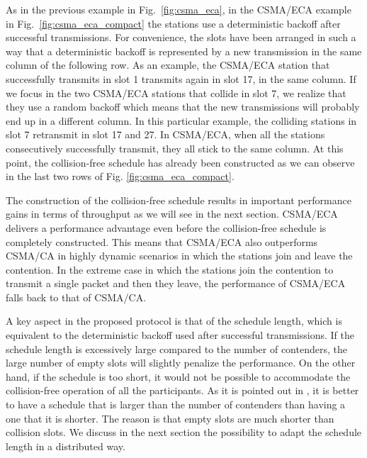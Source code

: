 \documentclass[journal]{IEEEtran}
\begin{document}
As in the previous example in Fig.~\ref{fig:csma_eca}, in the CSMA/ECA example in Fig.~\ref{fig:csma_eca_compact} the stations use a deterministic backoff after successful transmissions.
For convenience, the slots have been arranged in such a way that a deterministic backoff is represented by a new transmission in the same column of the following row.
As an example, the CSMA/ECA station that successfully transmits in slot 1 transmits again in slot 17, in the same column.
If we focus in the two CSMA/ECA stations that collide in slot 7, we realize that they use a random backoff which means that the new transmissions will probably end up in a different column.
In this particular example, the colliding stations in slot 7 retransmit in slot 17 and 27.
In CSMA/ECA, when all the stations consecutively successfully transmit, they all stick to the same column.
At this point, the collision-free schedule has already been constructed as we can observe in the last two rows of Fig. \ref{fig:csma_eca_compact}.

The construction of the collision-free schedule results in important performance gains in terms of throughput as we will see in the next section.
CSMA/ECA delivers a performance advantage even before the collision-free schedule is completely constructed.
This means that CSMA/ECA also outperforms CSMA/CA in highly dynamic scenarios in which the stations join and leave the contention.
In the extreme case in which the stations join the contention to transmit a single packet and then they leave, the performance of CSMA/ECA falls back to that of CSMA/CA.

A key aspect in the proposed protocol is that of the schedule length, which is equivalent to the deterministic backoff used after successful transmissions.
If the schedule length is excessively large compared to the number of contenders, the large number of empty slots will slightly penalize the performance.
On the other hand, if the schedule is too short, it would not be possible to accommodate the collision-free operation of all the participants.
As it is pointed out in \cite{fang2011dlm}, it is better to have a schedule that is larger than the number of contenders than having a one that it is shorter.
The reason is that empty slots are much shorter than collision slots.
We discuss in the next section the possibility to adapt the schedule length in a distributed way.
\end{document}

